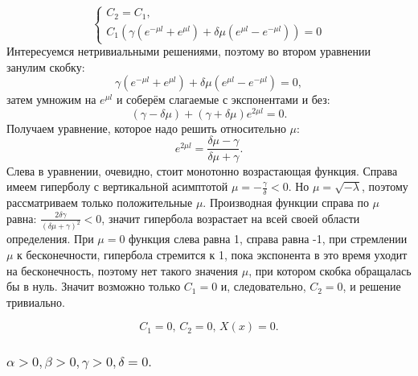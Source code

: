 \documentclass[12pt, a4paper]{article}
\begin{document}
\begin{displaymath}
	\begin{cases}
		C_{2} = C_{1}, \\
		C_{1} (\gamma (e^{-\mu l} + e^{\mu l}) + \delta \mu (e^{\mu l} - e^{-\mu l})) = 0
	\end{cases}
\end{displaymath}
Интересуемся нетривиальными решениями, поэтому во втором уравнении занулим скобку:
\[ \gamma (e^{-\mu l} + e^{\mu l}) + \delta \mu (e^{\mu l} - e^{-\mu l}) = 0, \]
затем умножим на $ e^{\mu l}$ и соберём слагаемые с экспонентами и без:
\[ (\gamma - \delta \mu) + (\gamma + \delta \mu) e^{2 \mu l} = 0. \]
Получаем уравнение, которое надо решить относительно $\mu$:
\[ e^{2 \mu l} = \frac{\delta \mu - \gamma}{\delta \mu + \gamma}. \]
Слева в уравнении, очевидно, стоит монотонно возрастающая функция. Справа имеем гиперболу с вертикальной асимптотой $\mu = -\frac{\gamma}{\delta} < 0$. Но $\mu = \sqrt{-\lambda}$, поэтому рассматриваем только положительные $\mu$. Производная функции справа по $\mu$ равна: $\frac{2\delta \gamma}{(\delta \mu + \gamma)^2} < 0$, значит гипербола возрастает на всей своей области определения. При $\mu = 0$ функция слева равна 1, справа равна -1, при стремлении $\mu$ к бесконечности, гипербола стремится к 1, пока экспонента в это время уходит на бесконечность, поэтому нет такого значения $\mu$, при котором скобка обращалась бы в нуль. Значит возможно только $C_{1} = 0$ и, следовательно, $C_{2} = 0$, и решение тривиально.

\[ C_{1} = 0, \, C_{2} = 0, \, X(x) = 0. \]

\subsubsection{ $ \alpha > 0, \beta > 0, \gamma > 0, \delta = 0. $}
\end{document}
